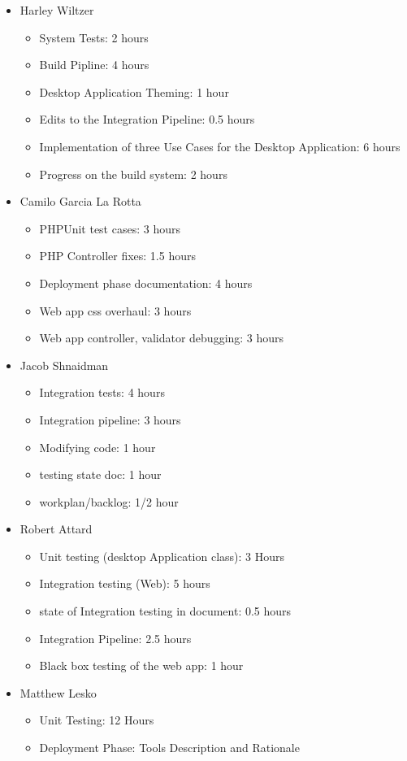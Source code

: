 \documentclass[12pt]{article}
\begin{document}
 \begin{itemize}
     \item Harley Wiltzer
        \begin{itemize}
            \item System Tests: 2 hours
            \item Build Pipline: 4 hours
            \item Desktop Application Theming: 1 hour
            \item Edits to the Integration Pipeline: 0.5 hours
            \item Implementation of three Use Cases for the Desktop Application: 6 hours
            \item Progress on the build system: 2 hours
        \end{itemize}
     \item Camilo Garcia La Rotta
     \begin{itemize}
         \item PHPUnit test cases: 3 hours
         \item PHP Controller fixes: 1.5 hours
         \item Deployment phase documentation: 4 hours
         \item Web app css overhaul: 3 hours
         \item Web app controller, validator debugging: 3 hours
     \end{itemize}
     \item Jacob Shnaidman
     \begin{itemize}
         \item Integration tests: 4 hours
         \item Integration pipeline: 3 hours
         \item Modifying code: 1 hour
         \item testing state doc: 1 hour
         \item workplan/backlog: 1/2 hour
     \end{itemize}
     \item Robert Attard
     \begin{itemize}
         \item Unit testing (desktop Application class): 3 Hours
         \item Integration testing (Web): 5 hours
         \item state of Integration testing in document: 0.5 hours
         \item Integration Pipeline: 2.5 hours 
         \item Black box testing of the web app: 1 hour
     \end{itemize}
     \item Matthew Lesko
     \begin{itemize}
        \item Unit Testing: 12 Hours
        \item Deployment Phase: Tools Description and Rationale
     \end{itemize}
 \end{itemize}
\end{document}
